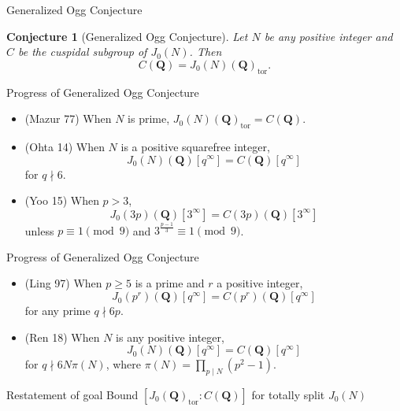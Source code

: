 \documentclass{beamer}
\newtheorem{conjecture}[theorem]{Conjecture}
\newcommand{\QQ}{\mathbf{Q}}
\newcommand{\tor}{\mathrm{tor}}
\begin{document}
\begin{frame}{Generalized Ogg Conjecture}
    \begin{conjecture}[Generalized Ogg Conjecture]
        Let $N$ be any positive integer and $C$ be the cuspidal subgroup of
        $J_0(N)$. Then
        \[
            C(\QQ) = J_0(N)(\QQ)_\tor.
        \]
    \end{conjecture}
\end{frame}

\begin{frame}{Progress of Generalized Ogg Conjecture}
    \begin{itemize}
        \item 
            (Mazur 77) When $N$ is prime, $J_0(N)(\QQ)_\tor =C(\QQ)$.
        \item
            (Ohta 14) When $N$ is a positive squarefree integer,
            \[
                J_0(N)(\QQ)[q^\infty]=C(\QQ)[q^\infty]
            \]
            for $q\nmid 6$.
        \item
            (Yoo 15) When $p>3$,
            \[
                J_0(3p)(\QQ)[3^\infty] = C(3p)(\QQ)[3^\infty]
            \]
            unless $p\equiv 1 \pmod{9}$ and $3^{\frac{p-1}{3}} \equiv 1
            \pmod{9}$.
    \end{itemize}
\end{frame}

\begin{frame}{Progress of Generalized Ogg Conjecture}
    \begin{itemize}
        \item
            (Ling 97) When $p\geq 5$ is a prime and $r$ a positive integer,
            \[
                J_0(p^r)(\QQ)[q^\infty] = C(p^r)(\QQ)[q^\infty]
            \]
            for any prime $q\nmid 6p$.
        \item
            (Ren 18) When $N$ is any positive integer,
            \[
                J_0(N)(\QQ)[q^\infty]=C(\QQ)[q^\infty]
            \]
            for $q\nmid 6N\pi(N)$, where $\pi(N) = \prod_{p\mid N}
            (p^2-1)$.
    \end{itemize}
\end{frame}

\begin{frame}{Restatement of goal}
    \large{Bound $[J_0(\QQ)_\tor:C(\QQ)]$ for totally split $J_0(N)$}
\end{frame}
\end{document}
